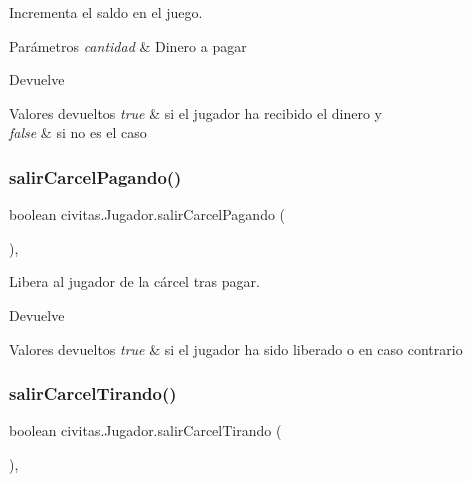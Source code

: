Incrementa el saldo en el juego. 
\begin{DoxyParams}{Parámetros}
{\em cantidad} & Dinero a pagar \\
\hline
\end{DoxyParams}
\begin{DoxyReturn}{Devuelve}

\end{DoxyReturn}

\begin{DoxyRetVals}{Valores devueltos}
{\em true} & si el jugador ha recibido el dinero y \\
\hline
{\em false} & si no es el caso \\
\hline
\end{DoxyRetVals}
\mbox{\label{classcivitas_1_1Jugador_ac084bcf2599582f25908cc4214cb6937}} 
\subsubsection{\texorpdfstring{salir\+Carcel\+Pagando()}{salirCarcelPagando()}}
{\footnotesize\ttfamily boolean civitas.\+Jugador.\+salir\+Carcel\+Pagando (\begin{DoxyParamCaption}{ }\end{DoxyParamCaption})\hspace{0.3cm}{\ttfamily [inline]}, {\ttfamily [package]}}

Libera al jugador de la cárcel tras pagar. \begin{DoxyReturn}{Devuelve}

\end{DoxyReturn}

\begin{DoxyRetVals}{Valores devueltos}
{\em true} & si el jugador ha sido liberado o  en caso contrario \\
\hline
\end{DoxyRetVals}
\mbox{\label{classcivitas_1_1Jugador_a2c4106981ddfb43872df3303685739c1}} 
\subsubsection{\texorpdfstring{salir\+Carcel\+Tirando()}{salirCarcelTirando()}}
{\footnotesize\ttfamily boolean civitas.\+Jugador.\+salir\+Carcel\+Tirando (\begin{DoxyParamCaption}{ }\end{DoxyParamCaption})\hspace{0.3cm}{\ttfamily [inline]}, {\ttfamily [package]}}

